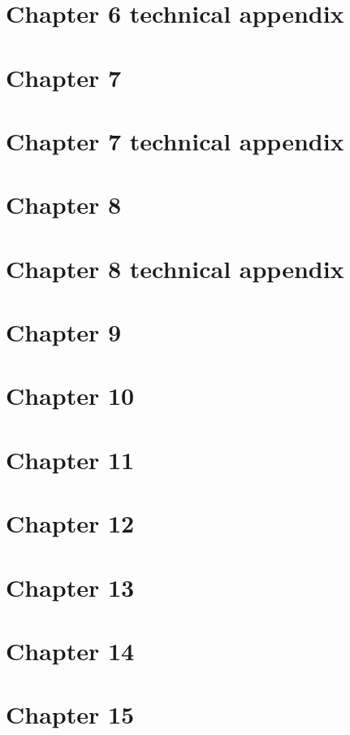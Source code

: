 \documentclass[10pt]{article}
\begin{document}
  \newpage
  \section*{Chapter 6 technical appendix}
  
  
  \newpage
  \section*{Chapter 7}
  
  
  \newpage
  \section*{Chapter 7 technical appendix}
  
  
  \newpage
  \section*{Chapter 8}
  
  
  \newpage
  \section*{Chapter 8 technical appendix}
  
  
  \newpage
  \section*{Chapter 9}
  
  
  \newpage
  \section*{Chapter 10}
  
  
  \newpage
  \section*{Chapter 11}
  
	  
  \newpage
  \section*{Chapter 12}
  
  
  \newpage
  \section*{Chapter 13}
  
  
  \newpage
  \section*{Chapter 14}
  
  
  \newpage
  \section*{Chapter 15}
  
\end{document}
